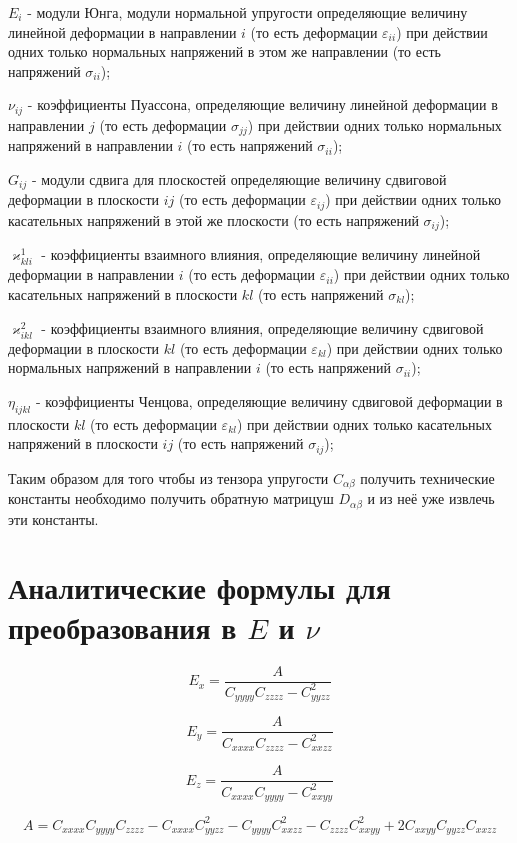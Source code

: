 $E_i$ - модули Юнга, модули нормальной упругости определяющие величину линейной деформации в направлении 
$i$ (то есть деформации 
$\varepsilon_{ii}$)
при действии одних только нормальных напряжений в этом же направлении (то есть напряжений 
$\sigma_{ii}$);

$\nu_{ij}$ - коэффициенты Пуассона, определяющие величину линейной деформации в направлении 
$j$ 
(то есть деформации 
$\sigma_{jj}$)
при действии одних только нормальных напряжений в направлении 
$i$ 
(то есть напряжений 
$\sigma_{ii}$);

$G_{ij}$ - модули сдвига для плоскостей определяющие величину сдвиговой деформации в плоскости 
$ij$ 
(то есть деформации 
$\varepsilon_{ij}$)
при действии одних только касательных напряжений в этой же плоскости (то есть напряжений 
$\sigma_{ij}$);

$\varkappa^1_{kli}$ - коэффициенты взаимного влияния, определяющие величину линейной деформации в направлении 
$i$ 
(то есть деформации 
$\varepsilon_{ii}$)
при действии одних только касательных напряжений в плоскости 
$kl$ 
(то есть напряжений 
$\sigma_{kl}$);

$\varkappa^2_{ikl}$ - коэффициенты взаимного влияния, определяющие величину сдвиговой деформации в плоскости 
$kl$ 
(то есть деформации 
$\varepsilon_{kl}$)
при действии одних только нормальных напряжений в направлении 
$i$ 
(то есть напряжений 
$\sigma_{ii}$);

$\eta_{ijkl}$ - коэффициенты Ченцова, определяющие величину сдвиговой деформации в плоскости 
$kl$ 
(то есть деформации 
$\varepsilon_{kl}$)
при действии одних только касательных напряжений в плоскости 
$ij$ 
(то есть напряжений 
$\sigma_{ij}$);

Таким образом для того чтобы из тензора упругости 
$C_{\alpha\beta}$ 
получить технические константы необходимо получить обратную матрицуш 
$D_{\alpha\beta}$ 
и из неё уже извлечь эти константы.

\section{
Аналитические формулы для преобразования в 
$E$ 
и 
$\nu$}

$$
E_x = \frac{A}{C_{yyyy}C_{zzzz}-C_{yyzz}^2}
$$

$$
E_y = \frac{A}{C_{xxxx}C_{zzzz}-C_{xxzz}^2}
$$

$$
E_z = \frac{A}{C_{xxxx}C_{yyyy}-C_{xxyy}^2}
$$

$$
A = C_{xxxx}C_{yyyy}C_{zzzz} - C_{xxxx}C_{yyzz}^2 - C_{yyyy}C_{xxzz}^2 -
C_{zzzz}C_{xxyy}^2 + 2C_{xxyy}C_{yyzz}C_{xxzz}
$$

